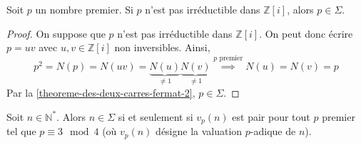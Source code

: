 	\begin{lemma}
		\label{theoreme-des-deux-carres-fermat-4}
		Soit $p$ un nombre premier. Si $p$ n'est pas irréductible dans $\mathbb{Z}[i]$, alors $p \in \Sigma$.
	\end{lemma}

	\begin{proof}
		On suppose que $p$ n'est pas irréductible dans $\mathbb{Z}[i]$. On peut donc écrire $p = uv$ avec $u, v \in \mathbb{Z}[i]$ non inversibles. Ainsi,
		\[ p^2 = N(p) = N(uv) = \underbrace{N(u)}_{\neq 1} \underbrace{N(v)}_{\neq 1} \overset{p \text{ premier}}{\implies} N(u) = N(v) = p \]
		Par la \cref{theoreme-des-deux-carres-fermat-2}, $p \in \Sigma$.
	\end{proof}

	\begin{theorem}
		Soit $n \in \mathbb{N}^*$. Alors $n \in \Sigma$ si et seulement si $v_p(n)$ est pair pour tout $p$ premier tel que $p \equiv 3 \mod 4$ (où $v_p(n)$ désigne la valuation $p$-adique de $n$).
	\end{theorem}

